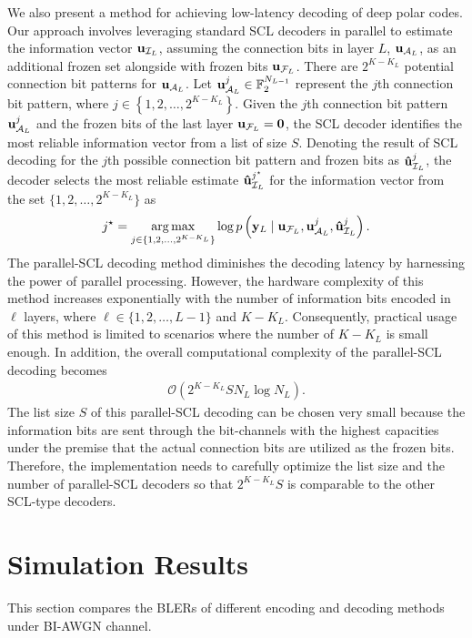 \documentclass[conference]{IEEEtran}
\DeclareMathOperator*{\argmax}{arg\,max}
\begin{document}
We also present a method for achieving low-latency decoding of deep polar codes. Our approach involves leveraging standard SCL decoders in parallel to estimate the information vector ${\bf u}_{\mathcal{I}_{L}}$, assuming the connection bits in layer $L$, ${\bf u}_{\mathcal{A}_{L}}$, as an additional frozen set alongside with frozen bits ${\bf u}_{\mathcal{F}_L}$. There are $2^{K-K_L}$ potential connection bit patterns for ${\bf u}_{\mathcal{A}_{L}}$. Let ${\bf u}_{\mathcal{A}_{L}}^j\in \mathbb{F}_2^{N_{L-1}}$ represent the $j$th connection bit pattern, where $j\in \left\{1,2,\ldots, 2^{K-K_L}\right\}$. Given the $j$th connection bit pattern ${\bf u}_{\mathcal{A}_{L}}^j$ and the frozen bits of the last layer ${\bf u}_{\mathcal{F}_{L}}={\bf 0}$, the SCL decoder identifies the most reliable information vector from a list of size $S$. Denoting the result of SCL decoding for the $j$th possible connection bit pattern and frozen bits as ${\bf \hat u}_{\mathcal{I}_{L}}^{j}$, the decoder selects the most reliable estimate ${\bf \hat u}_{\mathcal{I}_{L}}^{j^{\star}}$ for the information vector from the set $\{1,2,\ldots, 2^{K-K_L}\}$ as 
\begin{align}
 j^{\star}=\argmax_{j\in \{1,2,\ldots, 2^{K-K_L}\} }  \log p\left({\bf y}_L \mid {\bf u}_{\mathcal{F}_{L}}, {\bf u}_{\mathcal{A}_{L}}^j, {\bf \hat u}_{\mathcal{I}_{L}}^j\right).
\end{align}
The parallel-SCL decoding method diminishes the decoding latency by harnessing the power of parallel processing. However, the hardware complexity of this method increases exponentially with the number of information bits encoded in $\ell$ layers, where $\ell\in \{1,2,\ldots, L-1\}$ and $K-K_L$. Consequently, practical usage of this method is limited to scenarios where the number of $K-K_L$ is small enough. In addition, the overall computational complexity of the parallel-SCL decoding becomes 
\begin{align}
	\mathcal{O}\left(2^{K-K_L}SN_L\log N_L\right).
\end{align} 
The list size $S$ of this parallel-SCL decoding can be chosen very small because the information bits are sent through the bit-channels with the highest capacities under the premise that the actual connection bits are utilized as the frozen bits. Therefore, the implementation needs to carefully optimize the list size and the number of parallel-SCL decoders so that $2^{K-K_L}S$ is comparable to the other SCL-type decoders.  

\section{Simulation Results}
This section compares the BLERs of different encoding and decoding methods under BI-AWGN channel.  
\end{document}
